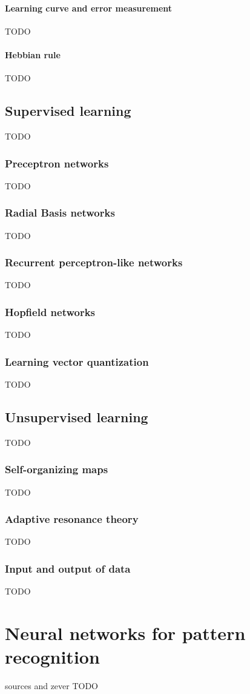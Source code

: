 \documentclass[pdftex,a4paper,12pt,twoside]{report}
\theoremstyle{plain} \newtheorem{theorem}{Theorem} \newtheorem{proposition}{Proposition} \newtheorem{lemma}{Lemma} \newtheorem*{corollary}{Corollary}
\theoremstyle{definition} \newtheorem{definition}{Definition} \newtheorem{conjecture}{Conjecture} \newtheorem*{example}{Example} \newtheorem{algorithm}{Algorithm}
\theoremstyle{remark} \newtheorem*{remark}{Remark} \newtheorem*{note}{Note} \newtheorem{case}{Case}
\begin{document}
\paragraph{Learning curve and error measurement}
TODO
\paragraph{Hebbian rule}
TODO
\subsection{Supervised learning}
TODO
\subsubsection{Preceptron networks}
TODO
\subsubsection{Radial Basis networks}
TODO
\subsubsection{Recurrent perceptron-like networks}
TODO
\subsubsection{Hopfield networks}
TODO
\subsubsection{Learning vector quantization}
TODO
\subsection{Unsupervised learning}
TODO
\subsubsection{Self-organizing maps}
TODO
\subsubsection{Adaptive resonance theory}
TODO
\subsubsection{Input and output of data}
TODO
\section{Neural networks for pattern recognition}
sources and zever
TODO
\end{document}
